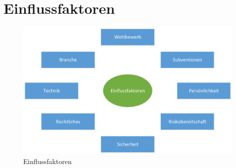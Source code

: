 \section{Einflussfaktoren}
	
\begin{figure}[H]
\centering
\includegraphics[width=1.0\linewidth]{Bilder/Einflussfaktoren}
\caption{Einflussfaktoren}
\label{fig:Einflussfaktoren}
\end{figure}

